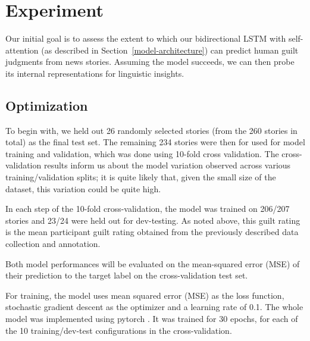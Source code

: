\documentclass[11pt,a4paper]{article}
\begin{document}
\section{Experiment}

Our initial goal is to assess the extent to which our bidirectional LSTM with self-attention (as described in Section~\ref{model-architecture}) can predict human guilt judgments from news stories. Assuming the model succeeds, we can then probe its internal representations for linguistic insights.


\subsection{Optimization}

To begin with, we held out 26 randomly selected stories (from the 260 stories in total) as the final test set. The remaining 234 stories were then for used for model training and validation, which was done using 10-fold cross validation. The cross-validation results inform us about the model variation observed across  various training/validation splits; it is quite likely that, given the small size of the dataset, this variation could be quite high.

In each step of the 10-fold cross-validation, the model was trained on 206/207 stories and 23/24 were held out for dev-testing. As noted above, this guilt rating is the mean participant guilt rating obtained from the previously described data collection and annotation.

Both model performances will be evaluated on the mean-squared error (MSE) of their prediction to the target label on the cross-validation test set.

For training, the model uses mean squared error (MSE) as the loss function, stochastic gradient descent as the optimizer and a learning rate of 0.1. The whole model was implemented using pytorch \citep{Paszke:2017}. It was trained for 30 epochs, for each of the 10 training/dev-test configurations in the cross-validation.

\end{document}
